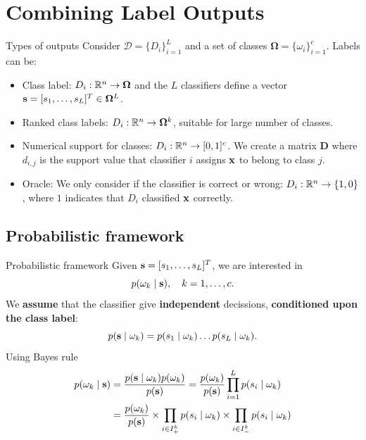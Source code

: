 \documentclass[xcolor=table]{beamer}
\begin{document}

\section{Combining Label Outputs}

\begin{frame}{Types of outputs}
    Consider \(\mathbf{\mathcal D} = \{D_i\}_{i=1}^L\) and a set of classes \(\mathbf{\Omega} = \{\omega_i\}_{i=1}^c\). Labels can be:
    \pause
    \begin{itemize}
        \item Class label: \(D_i: {\mathbb R}^n \to \mathbf{\Omega}\) and the \(L\) classifiers define a vector \({\mathbf s} = [s_1,\dots,s_L]^T \in \mathbf{\Omega}^L\).
        \pause
        \item Ranked class labels: \(D_i: {\mathbb R}^n \to \mathbf{\Omega}^k \), suitable for large number of classes.
        \pause
        \item Numerical support for classes: \(D_i:{\mathbb R}^n \to [0,1]^c\). We create a matrix \(\mathbf D\) where \(d_{i,j}\) is the support value that classifier \(i\) assigns \({\mathbf x}\) to belong to class \(j\). 
        \pause
        \item Oracle: We only consider if the classifier is correct or wrong: \(D_i: {\mathbb R}^n \to \{1,0\}\),  where \(1\) indicates that \(D_i\) classified \({\mathbf x}\) correctly.
    \end{itemize}
\end{frame}

\subsection{Probabilistic framework}

\begin{frame}{Probabilistic framework}
    Given \({\mathbf s} = [s_1,\dots,s_L]^T\), we are interested in
    \[
    p(\omega_k \mid {\mathbf s}), \quad k=1,\dots,c.
    \]
    We \textbf{assume} that the classifier give \textbf{independent} decissions, \textbf{conditioned upon the class label}:
    \[
    p({\mathbf s} \mid \omega_k) = p(s_1\mid \omega_k) \dots p(s_L\mid \omega_k).
    \]
    \pause
    Using Bayes rule
    \begin{align*}
    p(\omega_k \mid {\mathbf s}) & = \frac{p({\mathbf s} \mid \omega_k) p(\omega_k)}{p({\mathbf s})} = \frac{p(\omega_k)}{p({\mathbf s})} \prod_{i=1}^L p(s_i \mid \omega_k) \\
    & = \frac{p(\omega_k)}{p({\mathbf s})} \times \prod_{i\in I^k_+} p(s_i \mid \omega_k) \times \prod_{i\in I^k_-} p(s_i \mid \omega_k)
    \end{align*}
    
\end{frame}
\end{document}
